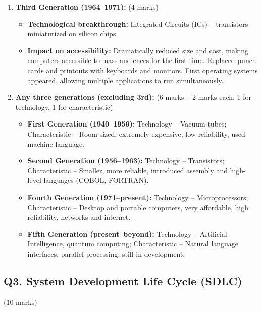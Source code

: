 \documentclass[12pt]{article}
\begin{document}
\begin{enumerate}[label=(\alph*)]
    \item \textbf{Third Generation (1964--1971):} \hfill (4 marks)
    \begin{itemize}
        \item \textbf{Technological breakthrough:} Integrated Circuits (ICs) -- transistors miniaturized on silicon chips.
        \item \textbf{Impact on accessibility:} Dramatically reduced size and cost, making computers accessible to mass audiences for the first time. Replaced punch cards and printouts with keyboards and monitors. First operating systems appeared, allowing multiple applications to run simultaneously.
    \end{itemize}

    \item \textbf{Any three generations (excluding 3rd):} \hfill (6 marks -- 2 marks each: 1 for technology, 1 for characteristic)

    \begin{itemize}
        \item \textbf{First Generation (1940--1956):} Technology -- Vacuum tubes; Characteristic -- Room-sized, extremely expensive, low reliability, used machine language.
        \item \textbf{Second Generation (1956--1963):} Technology -- Transistors; Characteristic -- Smaller, more reliable, introduced assembly and high-level languages (COBOL, FORTRAN).
        \item \textbf{Fourth Generation (1971--present):} Technology -- Microprocessors; Characteristic -- Desktop and portable computers, very affordable, high reliability, networks and internet.
        \item \textbf{Fifth Generation (present--beyond):} Technology -- Artificial Intelligence, quantum computing; Characteristic -- Natural language interfaces, parallel processing, still in development.
    \end{itemize}
\end{enumerate}

\bigskip

\subsection*{Q3. System Development Life Cycle (SDLC)} \hfill (10 marks)
\end{document}
